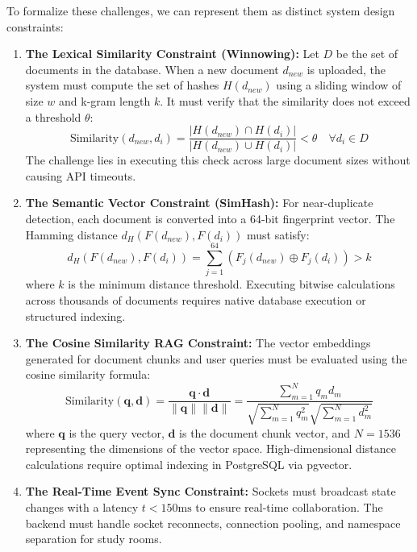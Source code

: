 \documentclass[12,Times new Roman,a4paper]{report}
\begin{document}
To formalize these challenges, we can represent them as distinct system design constraints:
\begin{enumerate}
    \item \textbf{The Lexical Similarity Constraint (Winnowing):} Let $D$ be the set of documents in the database. When a new document $d_{new}$ is uploaded, the system must compute the set of hashes $H(d_{new})$ using a sliding window of size $w$ and k-gram length $k$. It must verify that the similarity does not exceed a threshold $\theta$:
    \begin{equation}
    \text{Similarity}(d_{new}, d_i) = \frac{|H(d_{new}) \cap H(d_i)|}{|H(d_{new}) \cup H(d_i)|} < \theta \quad \forall d_i \in D
    \end{equation}
    The challenge lies in executing this check across large document sizes without causing API timeouts.
    
    \item \textbf{The Semantic Vector Constraint (SimHash):} For near-duplicate detection, each document is converted into a 64-bit fingerprint vector. The Hamming distance $d_H(F(d_{new}), F(d_i))$ must satisfy:
    \begin{equation}
    d_H(F(d_{new}), F(d_i)) = \sum_{j=1}^{64} (F_j(d_{new}) \oplus F_j(d_i)) > k
    \end{equation}
    where $k$ is the minimum distance threshold. Executing bitwise calculations across thousands of documents requires native database execution or structured indexing.
    
    \item \textbf{The Cosine Similarity RAG Constraint:} The vector embeddings generated for document chunks and user queries must be evaluated using the cosine similarity formula:
    \begin{equation}
    \text{Similarity}(\mathbf{q}, \mathbf{d}) = \frac{\mathbf{q} \cdot \mathbf{d}}{\|\mathbf{q}\| \|\mathbf{d}\|} = \frac{\sum_{m=1}^{N} q_m d_m}{\sqrt{\sum_{m=1}^{N} q_m^2} \sqrt{\sum_{m=1}^{N} d_m^2}}
    \end{equation}
    where $\mathbf{q}$ is the query vector, $\mathbf{d}$ is the document chunk vector, and $N = 1536$ representing the dimensions of the vector space. High-dimensional distance calculations require optimal indexing in PostgreSQL via pgvector.
    
    \item \textbf{The Real-Time Event Sync Constraint:} Sockets must broadcast state changes with a latency $t < 150\text{ms}$ to ensure real-time collaboration. The backend must handle socket reconnects, connection pooling, and namespace separation for study rooms.
\end{enumerate}
\end{document}
